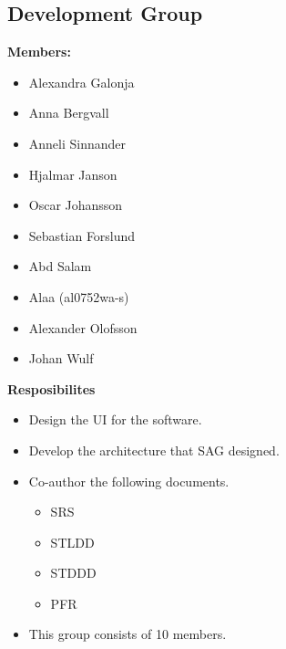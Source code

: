 \documentclass{article}
\begin{document}
    \subsection{Development Group}
        \textbf{Members: }
        \begin{itemize}
            \item Alexandra Galonja
            \item Anna Bergvall
            \item Anneli Sinnander
            \item Hjalmar Janson
            \item Oscar Johansson
            \item Sebastian Forslund
            \item Abd Salam
            \item Alaa (al0752wa-s)
            \item Alexander Olofsson
            \item Johan Wulf
        \end{itemize}
        \textbf{Resposibilites}
        \begin{itemize}
            \item Design the UI for the software.
            \item Develop the architecture that SAG designed.
            \item Co-author the following documents.
                \begin{itemize}
                    \item SRS
                    \item STLDD
                    \item STDDD
                    \item PFR
                \end{itemize}
             
            \item This group consists of 10 members.
        \end{itemize}
    
\end{document}
